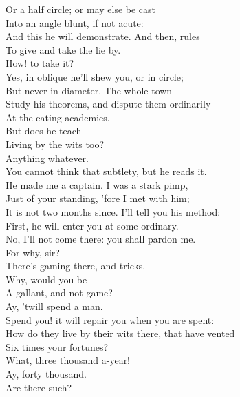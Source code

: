 \documentclass{memoir}
\begin{document}
\begin{drama*}
 Or a half circle; or may else be cast\\
 Into an angle blunt, if not acute:\\
 And this he will demonstrate. And then, rules\\
 To give and take the lie by.\\
\kastrilspeaks {} How! to take it?\\
\facespeaks  Yes, in oblique he'll shew you, or in circle;\\
 But never in diameter. The whole town\\
 Study his theorems, and dispute them ordinarily\\
 At the eating academies.\\
\kastrilspeaks {} But does he teach\\
 Living by the wits too?\\
\facespeaks {} Anything whatever.\\
 You cannot think that subtlety, but he reads it.\\
 He made me a captain. I was a stark pimp,\\
 Just of your standing, 'fore I met with him;\\
 It is not two months since. I'll tell you his method:\\
 First, he will enter you at some ordinary.\\
\kastrilspeaks  No, I'll not come there: you shall pardon me.\\
\facespeaks  For why, sir?\\
\kastrilspeaks {} There's gaming there, and tricks.\\
\facespeaks {} Why, would you be\\
 A gallant, and not game?\\
\kastrilspeaks {} Ay, 'twill spend a man.\\
\facespeaks  Spend you! it will repair you when you are spent:\\
 How do they live by their wits there, that have vented\\
 Six times your fortunes?\\
\kastrilspeaks {} What, three thousand a-year!\\
\facespeaks  Ay, forty thousand.\\
\kastrilspeaks {} Are there such?\\

\end{drama*}
\end{document}
